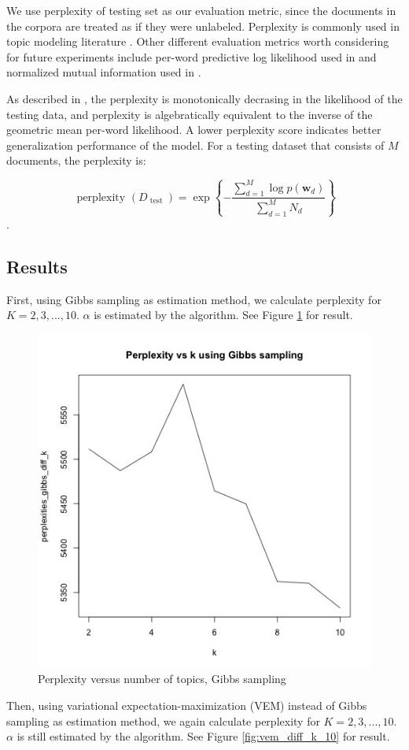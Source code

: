 \documentclass{article}
\begin{document}
We use perplexity of testing set as our evaluation metric, since the documents in the corpora are treated as if they were unlabeled. Perplexity is commonly used in topic modeling literature \cite{blei2003latent,blei2007correlated}. Other different evaluation metrics worth considering for future experiments include per-word predictive log likelihood used in \cite{wang2018general} and normalized mutual information used in \cite{lu2011investigating}.

As described in \cite{blei2003latent}, the perplexity is monotonically decrasing in the likelihood of the testing data, and perplexity is algebratically equivalent to the inverse of the geometric mean per-word likelihood. A lower perplexity score indicates better generalization performance of the model. For a testing dataset that consists of $M$ documents, the perplexity is:

$$
\text { perplexity }\left(D_{\text { test }}\right)=\exp \left\{-\frac{\sum_{d=1}^{M} \log p\left(\mathbf{w}_{d}\right)}{\sum_{d=1}^{M} N_{d}}\right\}
$$.


\subsection{Results}

First, using Gibbs sampling as estimation method, we calculate perplexity for $K = 2, 3, ..., 10$. $\alpha$ is estimated by the algorithm. See Figure \ref{fig:gibbs_diff_k_10} for result.

\begin{figure}[h]
  \centering
  \includegraphics[width=0.5\linewidth]{images/gibbs_diff_k.jpg}
  \caption{Perplexity versus number of topics, Gibbs sampling}
  \label{fig:gibbs_diff_k_10}
\end{figure}

Then, using variational expectation-maximization (VEM) instead of Gibbs sampling as estimation method, we again calculate perplexity for $K = 2, 3, ..., 10$. $\alpha$ is still estimated by the algorithm. See Figure \ref{fig:vem_diff_k_10} for result.
\end{document}
